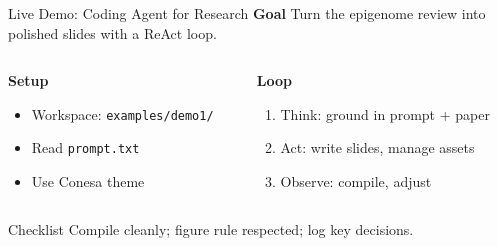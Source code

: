 \documentclass[aspectratio=169]{beamer}
\begin{document}
\begin{frame}{Live Demo: Coding Agent for Research}
  \textbf{Goal}\; Turn the epigenome review into polished slides with a ReAct loop.

  \vspace{0.5cm}
  \begin{columns}[T]
    \begin{column}{0.52\textwidth}
      \textbf{Setup}
      \begin{itemize}
        \item Workspace: \texttt{examples/demo1/}
        \item Read \texttt{prompt.txt}
        \item Use Conesa theme
      \end{itemize}
    \end{column}
    \begin{column}{0.44\textwidth}
      \textbf{Loop}
      \begin{enumerate}
        \item Think: ground in prompt + paper
        \item Act: write slides, manage assets
        \item Observe: compile, adjust
      \end{enumerate}
    \end{column}
  \end{columns}

  \begin{alertblock}{Checklist}
    Compile cleanly; figure rule respected; log key decisions.
  \end{alertblock}
\end{frame}
\end{document}
